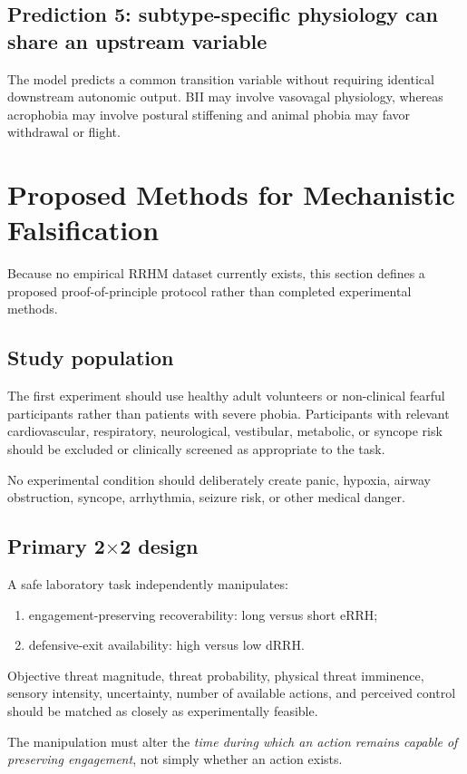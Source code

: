 \documentclass[9pt,twocolumn]{article}
\begin{document}
\subsection{Prediction 5: subtype-specific physiology can share an upstream variable}
The model predicts a common transition variable without requiring identical downstream autonomic output. BII may involve vasovagal physiology, whereas acrophobia may involve postural stiffening and animal phobia may favor withdrawal or flight.

\section{Proposed Methods for Mechanistic Falsification}
Because no empirical RRHM dataset currently exists, this section defines a proposed proof-of-principle protocol rather than completed experimental methods.

\subsection{Study population}
The first experiment should use healthy adult volunteers or non-clinical fearful participants rather than patients with severe phobia. Participants with relevant cardiovascular, respiratory, neurological, vestibular, metabolic, or syncope risk should be excluded or clinically screened as appropriate to the task.

No experimental condition should deliberately create panic, hypoxia, airway obstruction, syncope, arrhythmia, seizure risk, or other medical danger.

\subsection{Primary 2$\times$2 design}
A safe laboratory task independently manipulates:
\begin{enumerate}[leftmargin=2em]
\item engagement-preserving recoverability: long versus short eRRH;
\item defensive-exit availability: high versus low dRRH.
\end{enumerate}

Objective threat magnitude, threat probability, physical threat imminence, sensory intensity, uncertainty, number of available actions, and perceived control should be matched as closely as experimentally feasible.

The manipulation must alter the \emph{time during which an action remains capable of preserving engagement}, not simply whether an action exists.
\end{document}

